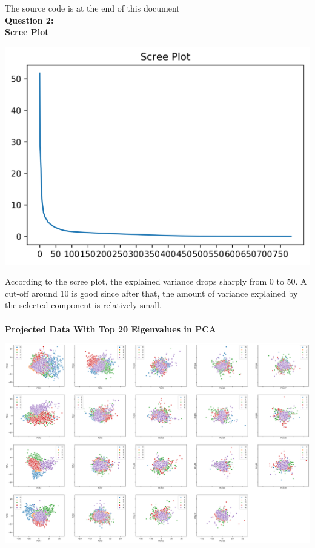 \documentclass[12pt]{article}
\begin{document}
\noindent
{\LARGE The source code is at the end of this document}\\
\textbf{\large Question 2:}\\
\textbf{Scree Plot}
\begin{center}
    \includegraphics[width=14cm]{../plots/Q2_ScreePlot.png}
\end{center}
\noindent
According to the scree plot, the explained variance drops sharply from 0 to 50. A cut-off around 10 is good since after that, the amount of variance explained by the selected component is relatively small.\\\\
\textbf{Projected Data With Top 20 Eigenvalues in PCA}
\begin{center}
    \includegraphics[width=18cm]{../plots/Q2_PCATop19.png}
\end{center}
\end{document}
